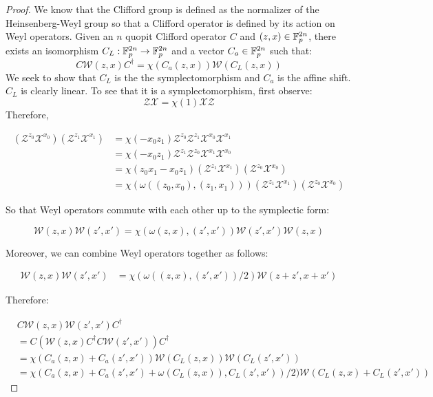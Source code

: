 \begin{proof}
We know that the Clifford group is defined as the normalizer of the Heinsenberg-Weyl group so that a Clifford operator is defined by its action on Weyl operators. Given an $n$ quopit Clifford operator $C$  and $(z,x)\in \mathbb{F}_p^{2n}$, there exists  an isomorphism $C_L:\mathbb{F}_p^{2n}\to \mathbb{F}_p^{2n}$ and a vector  $C_a\in \mathbb{F}_p^{2n}$ such that:
$$
C {\mathcal W}(z,x) C^\dag
=
\chi(C_a(z,x)){\mathcal W}(C_L(z,x))
$$
We seek to show that $C_L$ is the the symplectomorphism and $C_a$ is the affine shift.  $C_L$ is clearly linear.  To see that it is a symplectomorphism, first observe:
$$
\mathcal{Z}\mathcal{X}  = \chi(1)\mathcal{X} \mathcal{Z}
$$
Therefore, 

\begin{align*}
(\mathcal{Z}^{z_0}\mathcal{X}^{x_0})(\mathcal{Z}^{z_1}\mathcal{X}^{x_1} )
&=\chi(-x_0z_1) \mathcal{Z}^{z_0}\mathcal{Z}^{z_1}\mathcal{X}^{x_0}\mathcal{X}^{x_1}  \\
&=\chi(-x_0z_1)\mathcal{Z}^{z_1}  \mathcal{Z}^{z_0}\mathcal{X}^{x_1} \mathcal{X}^{x_0}  \\
&=\chi(z_0x_1-x_0z_1)(\mathcal{Z}^{z_1} \mathcal{X}^{x_1})(  \mathcal{Z}^{z_0}\mathcal{X}^{x_0} ) \\
&=\chi(\omega((z_0,x_0),(z_1,x_1)))(\mathcal{Z}^{z_1} \mathcal{X}^{x_1})(  \mathcal{Z}^{z_0}\mathcal{X}^{x_0} ) 
\end{align*}

So that Weyl operators commute with each other up to the symplectic form:

$$
{\mathcal W}(z,x) {\mathcal W}(z',x') = \chi(\omega(z,x),(z',x')) {\mathcal W}(z',x') {\mathcal W}(z,x) $$

Moreover, we can combine Weyl operators together as follows:

\begin{align*}
{\mathcal W}(z,x) {\mathcal W}(z',x')
&=\chi(\omega((z,x),(z',x'))/2){\mathcal W}(z+z',x+x') 
\end{align*}

Therefore:

\begin{align*}
&C\mathcal{W}(z,x)\mathcal{W}(z',x')C^\dag\\
&=C(\mathcal{W}(z,x) C^\dag C \mathcal{W}(z',x'))C^\dag\\
&=\chi(C_a(z,x)+C_a(z',x')) \mathcal{W}(C_L(z,x))\mathcal{W}(C_L(z',x')) \\
&=\chi(C_a(z,x)+C_a(z',x')+\omega(C_L(z,x)),C_L(z',x'))/2)  \mathcal{W}(C_L(z,x)+C_L(z',x')) 
\end{align*}


\end{proof}
